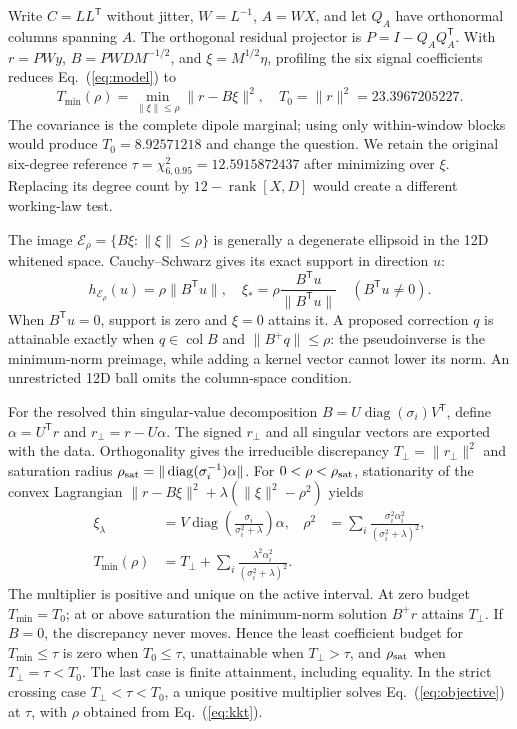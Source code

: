 \documentclass[aps,prd,reprint,onecolumn,superscriptaddress,nofootinbib]{revtex4-2}
\begin{document}
Write $C=LL^{\mathsf T}$ without jitter, $W=L^{-1}$, $A=WX$, and let $Q_A$ have orthonormal columns spanning $A$. The orthogonal residual projector is $P=I-Q_AQ_A^{\mathsf T}$. With $r=PWy$, $B=PWD M^{-1/2}$, and $\xi=M^{1/2}\eta$, profiling the six signal coefficients reduces Eq.~(\ref{eq:model}) to
\begin{equation}
 T_{\min}(\rho)=\min_{\|\xi\|\leq\rho}\|r-B\xi\|^2,
 \quad T_0=\|r\|^2=23.3967205227. \label{eq:profile}
\end{equation}
The covariance is the complete dipole marginal; using only within-window blocks would produce $T_0=8.92571218$ and change the question. We retain the original six-degree reference $\tau=\chi^2_{6,0.95}=12.5915872437$ after minimizing over $\xi$. Replacing its degree count by $12-\operatorname{rank}[X,D]$ would create a different working-law test.

The image $\mathcal E_\rho=\{B\xi:\|\xi\|\leq\rho\}$ is generally a degenerate ellipsoid in the 12D whitened space. Cauchy--Schwarz gives its exact support in direction $u$:
\begin{equation}
 h_{\mathcal E_\rho}(u)=\rho\|B^{\mathsf T}u\|,
 \quad \xi_*=\rho\frac{B^{\mathsf T}u}{\|B^{\mathsf T}u\|}\quad(B^{\mathsf T}u\ne0).
 \label{eq:support}
\end{equation}
When $B^{\mathsf T}u=0$, support is zero and $\xi=0$ attains it. A proposed correction $q$ is attainable exactly when $q\in\operatorname{col}B$ and $\|B^+q\|\leq\rho$: the pseudoinverse is the minimum-norm preimage, while adding a kernel vector cannot lower its norm. An unrestricted 12D ball omits the column-space condition.

For the resolved thin singular-value decomposition $B=U\operatorname{diag}(\sigma_i)V^{\mathsf T}$, define $\alpha=U^{\mathsf T}r$ and $r_\perp=r-U\alpha$. The signed $r_\perp$ and all singular vectors are exported with the data. Orthogonality gives the irreducible discrepancy $T_\perp=\|r_\perp\|^2$ and saturation radius $\rho_{\rm sat}=\|\operatorname{diag}(\sigma_i^{-1})\alpha\|$. For $0<\rho<\rho_{\rm sat}$, stationarity of the convex Lagrangian $\|r-B\xi\|^2+\lambda(\|\xi\|^2-\rho^2)$ yields
\begin{align}
 \xi_\lambda&=V\operatorname{diag}\!\left(\frac{\sigma_i}{\sigma_i^2+\lambda}\right)\alpha,
 &\rho^2&=\sum_i\frac{\sigma_i^2\alpha_i^2}{(\sigma_i^2+\lambda)^2},\label{eq:kkt}\\
 T_{\min}(\rho)&=T_\perp+\sum_i\frac{\lambda^2\alpha_i^2}{(\sigma_i^2+\lambda)^2}.
 \label{eq:objective}
\end{align}
The multiplier is positive and unique on the active interval. At zero budget $T_{\min}=T_0$; at or above saturation the minimum-norm solution $B^+r$ attains $T_\perp$. If $B=0$, the discrepancy never moves. Hence the least coefficient budget for $T_{\min}\leq\tau$ is zero when $T_0\leq\tau$, unattainable when $T_\perp>\tau$, and $\rho_{\rm sat}$ when $T_\perp=\tau<T_0$. The last case is finite attainment, including equality. In the strict crossing case $T_\perp<\tau<T_0$, a unique positive multiplier solves Eq.~(\ref{eq:objective}) at $\tau$, with $\rho$ obtained from Eq.~(\ref{eq:kkt}).
\end{document}
